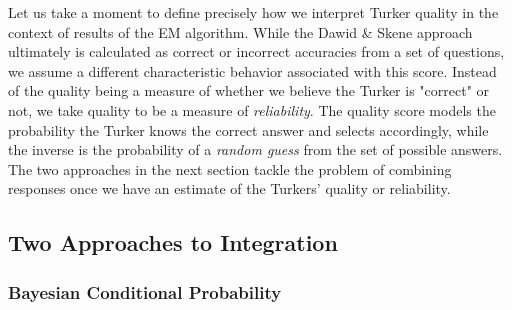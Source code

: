 Let us take a moment to define precisely how we interpret Turker quality in the context of results of the EM algorithm.  While the Dawid \& Skene approach ultimately is calculated as correct or incorrect accuracies from a set of questions, we assume a different characteristic behavior associated with this score.  Instead of the quality being a measure of whether we believe the Turker is "correct" or not, we take quality to be a measure of \textit{reliability}.  The quality score models the probability the Turker knows the correct answer and selects accordingly, while the inverse is the probability of a \textit{random guess} from the set of possible answers.  The two approaches in the next section tackle the problem of combining responses once we have an estimate of the Turkers' quality or reliability. 

\subsection{Two Approaches to Integration}



\subsubsection{Bayesian Conditional Probability}

